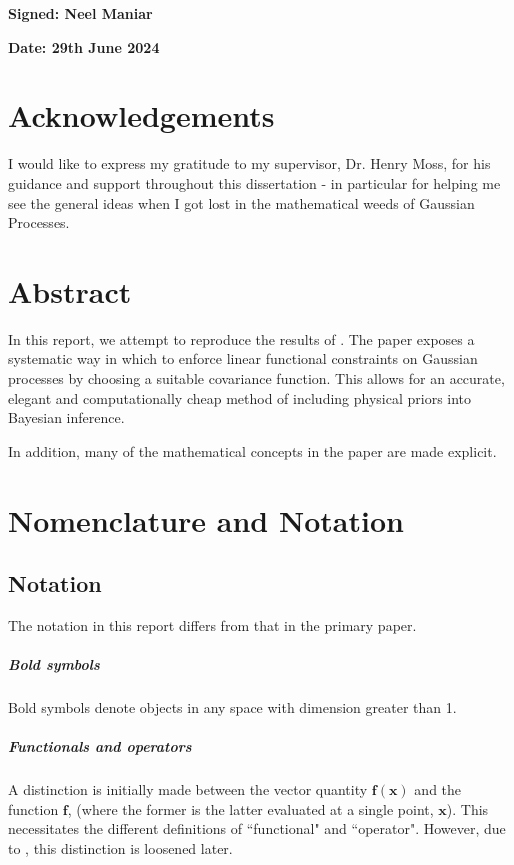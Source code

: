 \documentclass[12pt,a4paper,twoside]{report}
\theoremstyle{definition}
\begin{document}
\bigskip 
\textbf{Signed: Neel Maniar}

\bigskip
\textbf{Date: 29th June 2024}
\vspace{\fill}

\chapter*{Acknowledgements}
I would like to express my gratitude to my supervisor, Dr. Henry Moss, for his guidance and support throughout this dissertation - in particular for helping me see the general ideas when I got lost in the mathematical weeds of Gaussian Processes.

\chapter*{Abstract}
In this report, we attempt to reproduce the results of \cite{Jidling}. The paper exposes a systematic way in which to enforce linear functional constraints on Gaussian processes by choosing a suitable covariance function. This allows for an accurate, elegant and computationally cheap method of including physical priors into Bayesian inference.

In addition, many of the mathematical concepts in the paper are made explicit.

\tableofcontents
\chapter*{Nomenclature and Notation}\label{nomenclature}

\section{Notation}
The notation in this report differs from that in the primary paper.

\paragraph{Bold symbols}Bold symbols denote objects in any space with dimension greater than 1. 

\paragraph{Functionals and operators}A distinction is initially made between the vector quantity $\mathbf f(\mathbf x)$ and the function $\mathbf f$, (where the former is the latter evaluated at a single point, $\mathbf x$). This necessitates the different definitions of ``functional" and ``operator". However, due to , this distinction is loosened later.
\end{document}
